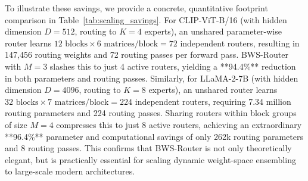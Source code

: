 \begin{itemize}
    To illustrate these savings, we provide a concrete, quantitative footprint comparison in Table~\ref{tab:scaling_savings}. For CLIP-ViT-B/16 (with hidden dimension $D=512$, routing to $K=4$ experts), an unshared parameter-wise router learns $12 \text{ blocks} \times 6 \text{ matrices/block} = 72$ independent routers, resulting in 147,456 routing weights and 72 routing passes per forward pass. BWS-Router with $M=3$ slashes this to just 4 active routers, yielding a **94.4\%** reduction in both parameters and routing passes. Similarly, for LLaMA-2-7B (with hidden dimension $D=4096$, routing to $K=8$ experts), an unshared router learns $32 \text{ blocks} \times 7 \text{ matrices/block} = 224$ independent routers, requiring 7.34 million routing parameters and 224 routing passes. Sharing routers within block groups of size $M=4$ compresses this to just 8 active routers, achieving an extraordinary **96.4\%** parameter and computational savings of only 262k routing parameters and 8 routing passes. This confirms that BWS-Router is not only theoretically elegant, but is practically essential for scaling dynamic weight-space ensembling to large-scale modern architectures.
    

\end{itemize}
